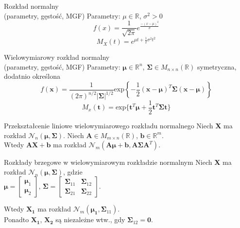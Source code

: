 \documentclass[avery5371, grid, frame]{flashcards}
\begin{document}
\begin{flashcard}[Definicja]{Rozkład normalny \\ (parametry, gęstość, MGF)}
    Parametry: $\mu \in \mathbb{R}$, $\sigma^2 > 0$
    $$ f(x) = \frac{1}{\sqrt{2\pi}} e^{\frac{-(x-\mu)^2}{\sigma}} $$
    $$ M_X(t) = e^{\mu t + \frac{1}{2}\sigma^2 t^2} $$
\end{flashcard}

\begin{flashcard}[Definicja]{Wielowymiarowy rozkład normalny \\ (parametry, gęstość, MGF)}
    Parametry: $\boldsymbol{\mu} \in \mathbb{R}^n$, $\boldsymbol{\Sigma} \in M_{n \times n}(\mathbb{R})$ symetryczna, dodatnio określona
    $$ f(\mathbf{x}) = \frac{1}{(2\pi)^{n/2} |\boldsymbol{\Sigma}|^{1/2}} \text{exp} \left \{ -\frac{1}{2} (\mathbf{x} - \boldsymbol{\mu})^T \boldsymbol{\Sigma} (\mathbf{x} - \boldsymbol{\mu}) \right \}$$
    $$M_x(\mathbf{t}) = \text{exp}\{ \mathbf{t}^T \boldsymbol{\mu} + \frac{1}{2} \mathbf{t}^T \boldsymbol{\Sigma} \boldsymbol{t}\} $$
\end{flashcard}

\begin{flashcard}[Twierdzenie]{Przekształcenie liniowe wielowymiarowego rozkładu normalnego}
    Niech \textbf{X} ma rozkład $\mathcal{N}_n (\boldsymbol{\mu}, \boldsymbol{\Sigma})$. Niech $\mathbf{A} \in M_{m \times n}(\mathbb{R})$, $\mathbf{b} \in \mathbb{R}^m$. \\
    Wtedy $\mathbf{AX} + \mathbf{b}$ ma rozkład $\mathcal{N}_m(\mathbf{A}\boldsymbol{\mu} + \mathbf{b}, \mathbf{A}\boldsymbol{\Sigma}\mathbf{A}^T)$.
\end{flashcard}

\begin{flashcard}[Twierdzenie]{Rozkłady brzegowe w wielowymiarowym rozkładzie normalnym}
    Niech \textbf{X} ma rozkład $\mathcal{N}_n (\boldsymbol{\mu}, \boldsymbol{\Sigma})$, gdzie \\
    $ \boldsymbol{\mu} =
    \left[ \begin{array}{c}
    \boldsymbol{\mu}_1 \\
    \boldsymbol{\mu}_2 \end{array} \right] $,
    $ \boldsymbol{\Sigma} =
    \left[ \begin{array}{cc}
    \boldsymbol{\Sigma}_{11} & \boldsymbol{\Sigma}_{12}\\
    \boldsymbol{\Sigma}_{21} & \boldsymbol{\Sigma}_{22} \end{array} \right] $. \newline
    
    Wtedy $\mathbf{X_1}$ ma rozkład $\mathcal{N}_m(\boldsymbol{\mu_1}, \boldsymbol{\Sigma}_{11})$. \\ Ponadto $\mathbf{X_1}$, $\mathbf{X_2}$ są niezależne wtw., gdy $\boldsymbol{\Sigma}_{12} = \mathbf{0}$.
\end{flashcard}
\end{document}
